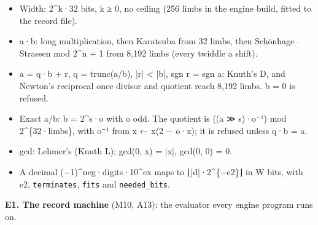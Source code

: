 \begin{itemize}
\item Width: 2\textasciicircum{}k·32 bits, k ≥ 0, no ceiling (256 limbs in the engine build, fitted to the record file).
\item a·b: long multiplication, then Karatsuba from 32 limbs, then Schönhage–Strassen mod 2\textasciicircum{}n + 1 from 8,192 limbs (every twiddle a shift).
\item a = q·b + r, q = trunc(a/b), |r| < |b|, sgn r = sgn a: Knuth's D, and Newton's reciprocal once divisor and quotient reach 8,192 limbs. b = 0 is refused.
\item Exact a/b: b = 2\textasciicircum{}s·o with o odd. The quotient is ((a ≫ s)·o⁻¹) mod 2\textasciicircum{}\{32·limbs\}, with o⁻¹ from x ← x(2 − o·x); it is refused unless q·b = a.
\item gcd: Lehmer's (Knuth L); gcd(0, x) = |x|, gcd(0, 0) = 0.
\item A decimal (−1)\textasciicircum{}neg·digits·10\textasciicircum{}ex maps to ⌊|d|·2\textasciicircum{}\{−e2\}⌋ in W bits, with e2, \texttt{terminates}, \texttt{fits} and \texttt{needed\_\allowbreak{}bits}.
\end{itemize}

\textbf{E1. The record machine} (M10, A13): the evaluator every engine program runs on.

